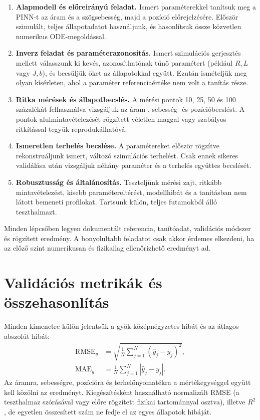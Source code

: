 \documentclass[11pt,a4paper]{article}
\newcommand{\RMSE}{\mathrm{RMSE}}
\newcommand{\MAE}{\mathrm{MAE}}
\begin{document}
\begin{enumerate}[label=\textbf{\arabic*.},leftmargin=*]
  \item \textbf{Alapmodell és előreirányú feladat.}
  Ismert paraméterekkel tanítsuk meg a PINN-t az áram és a szögsebesség, majd a pozíció előrejelzésére. Először szimulált, teljes állapotadatot használjunk, és hasonlítsuk össze közvetlen numerikus ODE-megoldással.

  \item \textbf{Inverz feladat és paraméterazonosítás.}
  Ismert szimulációs gerjesztés mellett válasszunk ki kevés, azonosíthatónak tűnő paramétert (például $R,L$ vagy $J,b$), és becsüljük őket az állapotokkal együtt. Ezután ismételjük meg olyan kísérleten, ahol a paraméter referenciaértéke nem volt a tanítás része.

  \item \textbf{Ritka mérések és állapotbecslés.}
  A mérési pontok 10, 25, 50 és 100 százalékát felhasználva vizsgáljuk az áram-, sebesség- és pozícióbecslést. A pontok alulmintavételezését rögzített véletlen maggal vagy szabályos ritkítással tegyük reprodukálhatóvá.

  \item \textbf{Ismeretlen terhelés becslése.}
  A paramétereket először rögzítve rekonstruáljunk ismert, változó szimulációs terhelést. Csak ennek sikeres validálása után vizsgáljuk néhány paraméter és a terhelés együttes becslését.

  \item \textbf{Robusztusság és általánosítás.}
  Teszteljünk mérési zajt, ritkább mintavételezést, kisebb paramétereltérést, modellhibát és a tanításban nem látott bemeneti profilokat. Tartsunk külön, teljes futamokból álló teszthalmazt.
\end{enumerate}

Minden lépcsőben legyen dokumentált referencia, tanítóadat, validációs módszer és rögzített eredmény. A bonyolultabb feladatot csak akkor érdemes elkezdeni, ha az előző szint numerikusan és fizikailag ellenőrizhető eredményt ad.

\section{Validációs metrikák és összehasonlítás}

Minden kimenetre külön jelentsük a gyök-középnégyzetes hibát és az átlagos abszolút hibát:
\begin{align}
  \RMSE_y &= \sqrt{\frac{1}{N}\sum_{j=1}^{N}(\hat{y}_j-y_j)^2},\\
  \MAE_y &= \frac{1}{N}\sum_{j=1}^{N}|\hat{y}_j-y_j|.
\end{align}
Az áramra, sebességre, pozícióra és terhelőnyomatékra a mértékegységgel együtt kell közölni az eredményt. Kiegészítésként használható normalizált RMSE (a teszthalmaz szórásával vagy előre rögzített fizikai tartománnyal osztva), illetve $R^2$, de egyetlen összesített szám ne fedje el az egyes állapotok hibáját.
\end{document}
